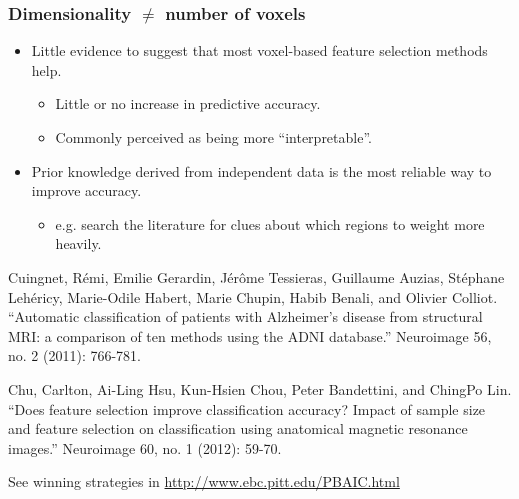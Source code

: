\documentclass{beamer}
\begin{document}
\begin{frame}
\frametitle{Dimensionality $\ne$ number of voxels}
\begin{itemize}
\item Little evidence to suggest that most voxel-based feature selection methods help.
\begin{itemize}
\item Little or no increase in predictive accuracy.
\item Commonly perceived as being more ``interpretable''.
\end{itemize}
\item Prior knowledge derived from independent data is the most reliable way to improve accuracy.
\begin{itemize}
\item e.g. search the literature for clues about which regions to weight more heavily.
\end{itemize}
\end{itemize}

\vspace{1cm}
{\tiny Cuingnet, R\'emi, Emilie Gerardin, J\'er\^ome Tessieras, Guillaume Auzias, St\'ephane Leh\'ericy, Marie-Odile Habert, Marie Chupin, Habib Benali, and Olivier Colliot. ``Automatic classification of patients with Alzheimer's disease from structural MRI: a comparison of ten methods using the ADNI database.'' Neuroimage 56, no. 2 (2011): 766-781.\par}
{\tiny Chu, Carlton, Ai-Ling Hsu, Kun-Hsien Chou, Peter Bandettini, and ChingPo Lin. ``Does feature selection improve classification accuracy? Impact of sample size and feature selection on classification using anatomical magnetic resonance images.'' Neuroimage 60, no. 1 (2012): 59-70.\par}
{\tiny See winning strategies in \url{http://www.ebc.pitt.edu/PBAIC.html}\par}
\end{frame}
\end{document}
